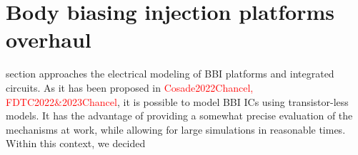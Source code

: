 
\section{Body biasing injection platforms overhaul}
 section approaches the electrical modeling of BBI platforms and integrated circuits.
As it has been proposed in \textcolor{red}{Cosade2022Chancel, FDTC2022\&2023Chancel}, it is possible to model BBI ICs using transistor-less models.
It has the advantage of providing a somewhat precise evaluation of the mechanisms at work, while allowing for large simulations in reasonable times.
Within this context, we decided